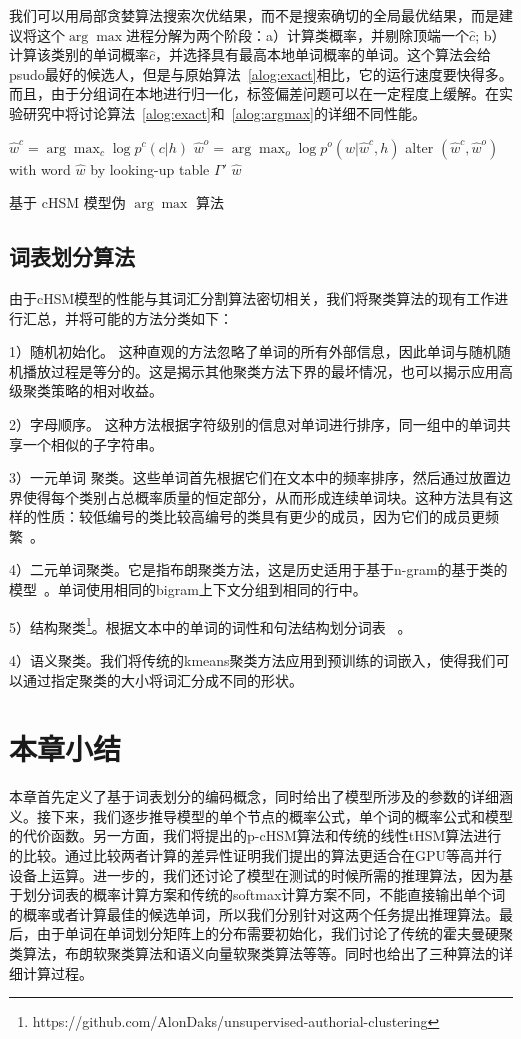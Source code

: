 我们可以用局部贪婪算法搜索次优结果，而不是搜索确切的全局最优结果，而是建议将这个$ \arg\max $进程分解为两个阶段：a）计算类概率，并剔除顶端一个$ \hat c $; b）计算该类别的单词概率$ \hat c $，并选择具有最高本地单词概率的单词。这个算法会给psudo最好的候选人，但是与原始算法~\ref{alog:exact}相比，它的运行速度要快得多。而且，由于分组词在本地进行归一化，标签偏差问题可以在一定程度上缓解。在实验研究中将讨论算法~\ref{alog:exact}和~\ref{alog:argmax}的详细不同性能。
\begin{algorithm}[!ht]
 $\hat w^c=\arg\max_c{\log p^c(c|h)}$ 
 $\hat w^o=\arg\max_o{\log p^o(w|\hat w^c,h)}$
 alter $(\hat w^c,\hat w^o)$ with word $\hat w$ by looking-up table $\Gamma'$ \;
 \Return $\hat w$
 \caption{基于 cHSM 模型伪 $\arg\max$ 算法}\label{alog:argmax}
\end{algorithm}

\subsection{词表划分算法}
由于cHSM模型的性能与其词汇分割算法密切相关，我们将聚类算法的现有工作进行汇总，并将可能的方法分类如下：

1）随机初始化。 这种直观的方法忽略了单词的所有外部信息，因此单词与随机随机播放过程是等分的。这是揭示其他聚类方法下界的最坏情况，也可以揭示应用高级聚类策略的相对收益。

2）字母顺序。 这种方法根据字符级别的信息对单词进行排序，同一组中的单词共享一个相似的子字符串。

3）一元单词 聚类。这些单词首先根据它们在文本中的频率排序，然后通过放置边界使得每个类别占总概率质量的恒定部分，从而形成连续单词块。这种方法具有这样的性质：较低编号的类比较高编号的类具有更少的成员，因为它们的成员更频繁~。

4）二元单词聚类。它是指布朗聚类方法，这是历史适用于基于n-gram的基于类的模型~。单词使用相同的bigram上下文分组到相同的行中。

5）结构聚类\footnote{https://github.com/AlonDaks/unsupervised-authorial-clustering}。根据文本中的单词的词性和句法结构划分词表~ 。

4）语义聚类。我们将传统的kmeans聚类方法应用到预训练的词嵌入，使得我们可以通过指定聚类的大小将词汇分成不同的形状。
\section{本章小结}
本章首先定义了基于词表划分的编码概念，同时给出了模型所涉及的参数的详细涵义。接下来，我们逐步推导模型的单个节点的概率公式，单个词的概率公式和模型的代价函数。另一方面，我们将提出的p-cHSM算法和传统的线性tHSM算法进行的比较。通过比较两者计算的差异性证明我们提出的算法更适合在GPU等高并行设备上运算。进一步的，我们还讨论了模型在测试的时候所需的推理算法，因为基于划分词表的概率计算方案和传统的softmax计算方案不同，不能直接输出单个词的概率或者计算最佳的候选单词，所以我们分别针对这两个任务提出推理算法。最后，由于单词在单词划分矩阵上的分布需要初始化，我们讨论了传统的霍夫曼硬聚类算法，布朗软聚类算法和语义向量软聚类算法等等。同时也给出了三种算法的详细计算过程。